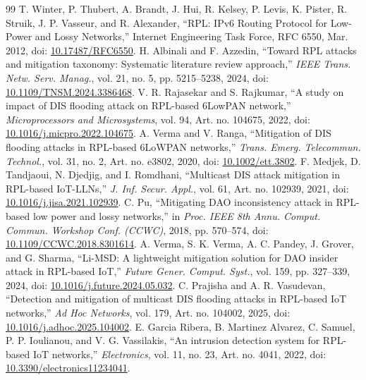 \documentclass[journal]{IEEEtran}
\begin{document}
\begin{thebibliography}{99}
 T. Winter, P. Thubert, A. Brandt, J. Hui, R. Kelsey, P. Levis, K. Pister, R. Struik, J. P. Vasseur, and R. Alexander, ``RPL: IPv6 Routing Protocol for Low-Power and Lossy Networks,'' Internet Engineering Task Force, RFC 6550, Mar. 2012, doi: \href{https://doi.org/10.17487/RFC6550}{10.17487/RFC6550}.
 H. Albinali and F. Azzedin, ``Toward RPL attacks and mitigation taxonomy: Systematic literature review approach,'' \emph{IEEE Trans. Netw. Serv. Manag.}, vol. 21, no. 5, pp. 5215--5238, 2024, doi: \href{https://doi.org/10.1109/TNSM.2024.3386468}{10.1109/TNSM.2024.3386468}.
 V. R. Rajasekar and S. Rajkumar, ``A study on impact of DIS flooding attack on RPL-based 6LowPAN network,'' \emph{Microprocessors and Microsystems}, vol. 94, Art. no. 104675, 2022, doi: \href{https://doi.org/10.1016/j.micpro.2022.104675}{10.1016/j.micpro.2022.104675}.
 A. Verma and V. Ranga, ``Mitigation of DIS flooding attacks in RPL-based 6LoWPAN networks,'' \emph{Trans. Emerg. Telecommun. Technol.}, vol. 31, no. 2, Art. no. e3802, 2020, doi: \href{https://doi.org/10.1002/ett.3802}{10.1002/ett.3802}.
 F. Medjek, D. Tandjaoui, N. Djedjig, and I. Romdhani, ``Multicast DIS attack mitigation in RPL-based IoT-LLNs,'' \emph{J. Inf. Secur. Appl.}, vol. 61, Art. no. 102939, 2021, doi: \href{https://doi.org/10.1016/j.jisa.2021.102939}{10.1016/j.jisa.2021.102939}.
 C. Pu, ``Mitigating DAO inconsistency attack in RPL-based low power and lossy networks,'' in \emph{Proc. IEEE 8th Annu. Comput. Commun. Workshop Conf. (CCWC)}, 2018, pp. 570--574, doi: \href{https://doi.org/10.1109/CCWC.2018.8301614}{10.1109/CCWC.2018.8301614}.
 A. Verma, S. K. Verma, A. C. Pandey, J. Grover, and G. Sharma, ``Li-MSD: A lightweight mitigation solution for DAO insider attack in RPL-based IoT,'' \emph{Future Gener. Comput. Syst.}, vol. 159, pp. 327--339, 2024, doi: \href{https://doi.org/10.1016/j.future.2024.05.032}{10.1016/j.future.2024.05.032}.
 C. Prajisha and A. R. Vasudevan, ``Detection and mitigation of multicast DIS flooding attacks in RPL-based IoT networks,'' \emph{Ad Hoc Networks}, vol. 179, Art. no. 104002, 2025, doi: \href{https://doi.org/10.1016/j.adhoc.2025.104002}{10.1016/j.adhoc.2025.104002}.
 E. Garcia Ribera, B. Martinez Alvarez, C. Samuel, P. P. Ioulianou, and V. G. Vassilakis, ``An intrusion detection system for RPL-based IoT networks,'' \emph{Electronics}, vol. 11, no. 23, Art. no. 4041, 2022, doi: \href{https://doi.org/10.3390/electronics11234041}{10.3390/electronics11234041}.

\end{thebibliography}
\end{document}
